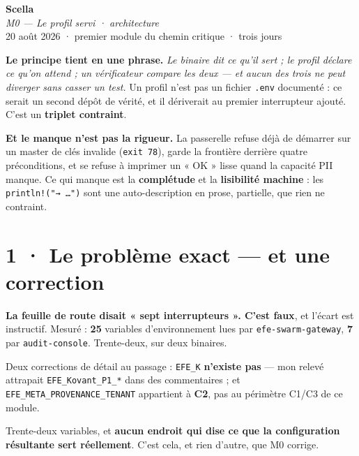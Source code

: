 \documentclass[10pt]{article}
\newcommand{\code}[1]{\texttt{\small #1}}
\begin{document}
\begin{center}
{\Huge\bfseries\color{navy} Scella}\\[4pt]
{\large\color{grey}\itshape M0 --- Le profil servi · architecture}\\[4pt]
{\small\color{grey} 20 août 2026 \; · \; premier module du chemin critique \; · \; trois jours}
\end{center}
\vspace{2pt}

\begin{these}
\textbf{Le principe tient en une phrase.} \emph{Le binaire dit ce qu'il sert ; le profil déclare ce
qu'on attend ; un vérificateur compare les deux --- et aucun des trois ne peut diverger sans casser un
test.} Un profil n'est pas un fichier \code{.env} documenté : ce serait un second dépôt de vérité, et
il dériverait au premier interrupteur ajouté. C'est un \textbf{triplet contraint}.

\textbf{Et le manque n'est pas la rigueur.} La passerelle refuse déjà de démarrer sur un master de
clés invalide (\code{exit 78}), garde la frontière derrière quatre préconditions, et se refuse à
imprimer un « OK » lisse quand la capacité PII manque. Ce qui manque est la \textbf{complétude} et la
\textbf{lisibilité machine} : les \code{println!("→ …")} sont une auto-description en prose, partielle,
que rien ne contraint.
\end{these}

\section{1 · Le problème exact --- et une correction}

\begin{alerte}
\textbf{La feuille de route disait « sept interrupteurs ». C'est faux}, et l'écart est instructif.
Mesuré : \textbf{25} variables d'environnement lues par \code{efe-swarm-gateway}, \textbf{7} par
\code{audit-console}. Trente-deux, sur deux binaires.

Deux corrections de détail au passage : \code{EFE\_K} \textbf{n'existe pas} --- mon relevé attrapait
\code{EFE\_Kovant\_P1\_*} dans des commentaires ; et \code{EFE\_META\_PROVENANCE\_TENANT} appartient à
\textbf{C2}, pas au périmètre C1/C3 de ce module.
\end{alerte}

Trente-deux variables, et \textbf{aucun endroit qui dise ce que la configuration résultante sert
réellement}. C'est cela, et rien d'autre, que M0 corrige.
\end{document}
